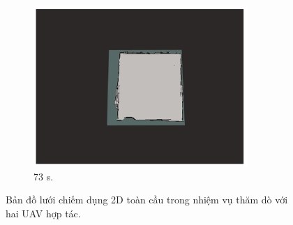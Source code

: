 \documentclass[11pt,openany]{book}
\begin{document}
\begin{figure}[H]
\begin{subfigure}[H]{0.3\linewidth}
        \includegraphics[width=\linewidth]{assets/4_12_i.png}
        \caption{{73 s.}}
        \label{fig:4.12i}
    \end{subfigure}
    \caption{{Bản đồ lưới chiếm dụng 2D toàn cầu trong nhiệm vụ thăm dò với hai UAV hợp tác.}}
    \label{fig:4.12}
\end{figure}
\end{document}
